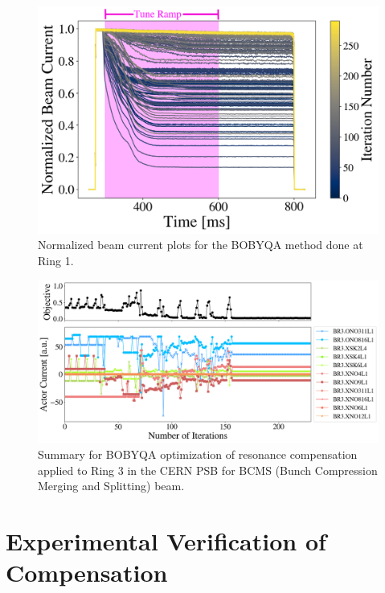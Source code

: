 \begin{figure}[H]
    \centering
    \includegraphics[width=\linewidth]{chapter5/i2_bobyqa_commented.png}
    \caption{Normalized beam current plots for the BOBYQA method done at Ring 1.}
    \label{fig:ibobyqa}
\end{figure}

\begin{figure}[H]
    \centering
    \includegraphics[width=\linewidth]{chapter5/2023_05_04_R3_BCMS_bobyqa.png}
    \caption{Summary for BOBYQA optimization of resonance compensation applied to Ring 3 in the CERN PSB for BCMS (Bunch Compression Merging and Splitting) beam.}
    \label{fig:bobyqa1}
\end{figure}

\section{Experimental Verification of Compensation}

